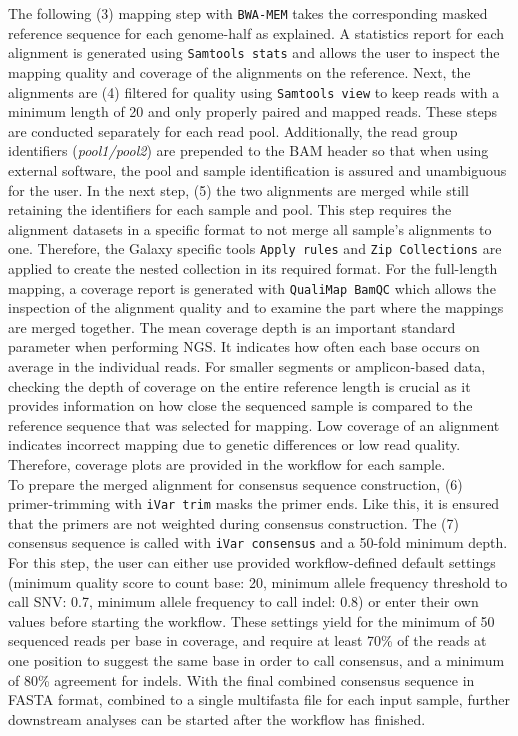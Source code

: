 The following (3) mapping step with \texttt{BWA-MEM} takes the corresponding masked reference sequence for each genome-half as explained. A statistics report for each alignment is generated using \texttt{Samtools stats} and allows the user to inspect the mapping quality and coverage of the alignments on the reference. Next, the alignments are (4) filtered for quality using \texttt{Samtools view} to keep reads with a minimum length of 20 and only properly paired and mapped reads. These steps are conducted separately for each read pool. Additionally, the read group identifiers (\textit{pool1/pool2}) are prepended to the \ac{BAM} header so that when using external software, the pool and sample identification is assured and unambiguous for the user. In the next step, (5) the two alignments are merged while still retaining the identifiers for each sample and pool. This step requires the alignment datasets in a specific format to not merge all sample's alignments to one. Therefore, the Galaxy specific tools \texttt{Apply rules} and \texttt{Zip Collections} are applied to create the nested collection in its required format. For the full-length mapping, a coverage report is generated with \texttt{QualiMap BamQC} which allows the inspection of the alignment quality and to examine the part where the mappings are merged together. The mean coverage depth is an important standard parameter when performing \ac{NGS}. It indicates how often each base occurs on average in the individual reads. For smaller segments or amplicon-based data, checking the depth of coverage on the entire reference length is crucial as it provides information on how close the sequenced sample is compared to the reference sequence that was selected for mapping. Low coverage of an alignment indicates incorrect mapping due to genetic differences or low read quality. Therefore, coverage plots are provided in the workflow for each sample.\\
To prepare the merged alignment for consensus sequence construction, (6) primer-trimming with \texttt{iVar trim} masks the primer ends. Like this, it is ensured that the primers are not weighted during consensus construction. The (7) consensus sequence is called with \texttt{iVar consensus} and a 50-fold minimum depth. For this step, the user can either use provided workflow-defined default settings (minimum quality score to count base: 20, minimum allele frequency threshold to call \ac{SNV}: 0.7, minimum allele frequency to call indel: 0.8) or enter their own values before starting the workflow. These settings yield for the minimum of 50 sequenced reads per base in coverage, and require at least 70\% of the reads at one position to suggest the same base in order to call consensus, and a minimum of 80\% agreement for indels. With the final combined consensus sequence in FASTA format, combined to a single multifasta file for each input sample, further downstream analyses can be started after the workflow has finished.

